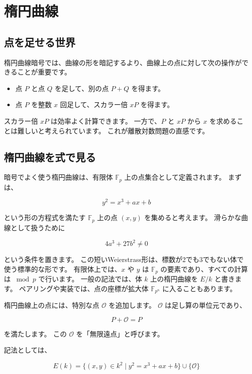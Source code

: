 \documentclass[a4paper,11pt]{ltjsarticle}
\newcommand{\F}{\mathbb{F}}
\begin{document}
\section{楕円曲線}

\subsection{点を足せる世界}

楕円曲線暗号では、曲線の形を暗記するより、曲線上の点に対して次の操作ができることが重要です。

\begin{itemize}
  \item 点 \(P\) と点 \(Q\) を足して、別の点 \(P+Q\) を得ます。
  \item 点 \(P\) を整数 \(x\) 回足して、スカラー倍 \(xP\) を得ます。
\end{itemize}

スカラー倍 \(xP\) は効率よく計算できます。
一方で、\(P\) と \(xP\) から \(x\) を求めることは難しいと考えられています。
これが離散対数問題の直感です。

\subsection{楕円曲線を式で見る}

暗号でよく使う楕円曲線は、有限体 \(\F_p\) 上の点集合として定義されます。
まずは、

\[
  y^2 = x^3 + ax + b
\]

という形の方程式を満たす \(\F_p\) 上の点 \((x,y)\) を集めると考えます。
滑らかな曲線として扱うために

\[
  4a^3+27b^2 \ne 0
\]

という条件を置きます。
この短いWeierstrass形は、標数が2でも3でもない体で使う標準的な形です。
有限体上では、\(x\) や \(y\) は \(\F_p\) の要素であり、すべての計算は \(\bmod p\) で行います。
一般の記法では、体 \(k\) 上の楕円曲線を \(E/k\) と書きます。
ペアリングや実装では、点の座標が拡大体 \(\F_{p^n}\) に入ることもあります。

楕円曲線上の点には、特別な点 \(\mathcal{O}\) を追加します。
\(\mathcal{O}\) は足し算の単位元であり、

\[
  P+\mathcal{O}=P
\]

を満たします。
この \(\mathcal{O}\) を「無限遠点」と呼びます。

記法としては、

\[
  E(k)=\{(x,y)\in k^2\mid y^2=x^3+ax+b\}\cup\{\mathcal{O}\}
\]
\end{document}
